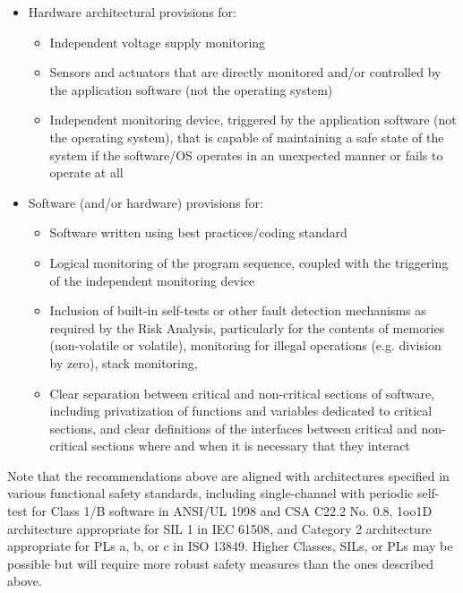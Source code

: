 \documentclass[12pt]{../Common_files/ElisaPaper}
\begin{document}
\begin{itemize}

\item Hardware architectural provisions for:

\begin{itemize}

\item Independent voltage supply monitoring

\item Sensors and actuators that are directly monitored and/or controlled by the application software (not the operating system)

\item Independent monitoring device, triggered by the application software (not the operating system), that is capable of maintaining a safe state of the system if the software/OS operates in an unexpected manner or fails to operate at all

\end{itemize}

\item Software (and/or hardware) provisions for:

\begin{itemize}

\item Software written using best practices/coding standard

\item Logical monitoring of the program sequence, coupled with the triggering of the independent monitoring device

\item Inclusion of built-in self-tests or other fault detection mechanisms as required by the Risk Analysis, particularly for the contents of memories (non-volatile or volatile), monitoring for illegal operations (e.g. division by zero), stack monitoring,

\item Clear separation between critical and non-critical sections of software, including privatization of functions and variables dedicated to critical sections, and clear definitions of the interfaces between critical and non-critical sections where and when it is necessary that they interact

\end{itemize}

\end{itemize}

Note that the recommendations above are aligned with architectures specified in various functional safety standards, including single-channel with periodic self-test for Class 1/B software in ANSI/UL 1998 and CSA C22.2 No. 0.8, 1oo1D architecture appropriate for SIL 1 in IEC 61508, and Category 2 architecture appropriate for PLs a, b, or c in ISO 13849.  Higher Classes, SILs, or PLs may be possible but will require more robust safety measures than the ones described above.
\end{document}
